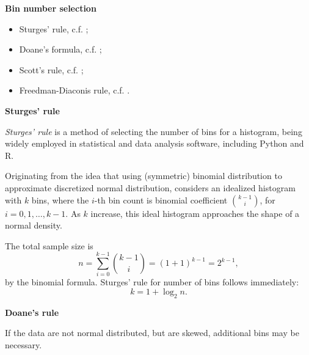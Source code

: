\documentclass[19pt,landscaoe]{article}
\begin{document}
\newpage
{\LARGE\centerline{\textbf{Bin number selection}}}
\vskip25pt
\begin{minipage}{.9\textwidth}
    \Large 
\begin{itemize}
    \item Sturges' rule, c.f. \cite{sturges26};
    \item Doane's formula, c.f. \cite{doane76};
    \item Scott's rule, c.f. \cite{scott79};
    \item Freedman-Diaconis rule, c.f. \cite{FreedmanDiaconis81}. 
\end{itemize}
\end{minipage}

\newpage
{\LARGE{\textbf{Sturges' rule}}}
\vskip25pt
\begin{minipage}{.9\textwidth}
    \Large 
{\it Sturges' rule} is a method of selecting the number of bins for a histogram, being widely employed in statistical and data analysis software, including Python and R. 

Originating from the idea that using (symmetric) binomial distribution to approximate discretized normal distribution, \cite{sturges26} considers an idealized histogram with $k$ bins, where the $i$-th bin count is binomial coefficient ${k-1 \choose i}$, for $i=0,1,\dots,k-1$. As $k$ increase, this ideal histogram approaches the shape of a normal density. 

The total sample size is 
$$n=\sum_{i=0}^{k-1}{k-1 \choose i}=(1+1)^{k-1}=2^{k-1},$$
by the binomial formula. Sturges' rule for number of bins follows immediately:
\begin{equation}\label{sturges-rule}
    k=1+\log_2n.
\end{equation}
\end{minipage}

\newpage
{\LARGE{\textbf{Doane's rule}}}
\vskip15pt
\begin{minipage}{.9\textwidth}
    \Large 
If the data are not normal distributed, but are skewed, additional bins may be necessary. 
\end{minipage}



\end{document}
